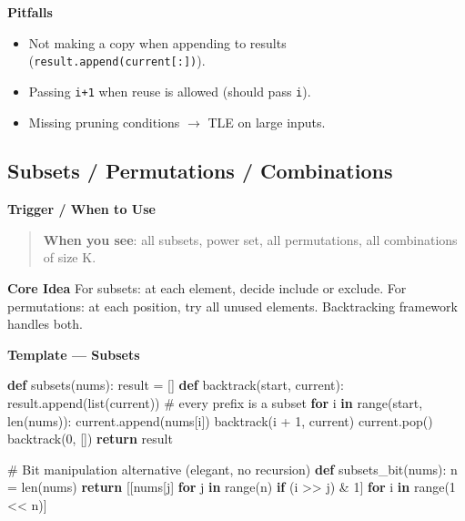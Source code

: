 \documentclass[11pt]{article}
\providecommand{\tightlist}{\setlength{\itemsep}{1pt}\setlength{\parskip}{0pt}}
\newenvironment{Shaded}{\begin{snugshade}}{\end{snugshade}}
\newcommand{\BuiltInTok}[1]{\textcolor[rgb]{0.50,0.55,0.55}{#1}}
\newcommand{\CommentTok}[1]{\textcolor[rgb]{0.48,0.49,0.49}{#1}}
\newcommand{\ControlFlowTok}[1]{\textcolor[rgb]{0.99,0.74,0.29}{\textbf{#1}}}
\newcommand{\DecValTok}[1]{\textcolor[rgb]{0.96,0.45,0.00}{#1}}
\newcommand{\KeywordTok}[1]{\textcolor[rgb]{0.81,0.81,0.76}{\textbf{#1}}}
\newcommand{\NormalTok}[1]{\textcolor[rgb]{0.81,0.81,0.76}{#1}}
\newcommand{\OperatorTok}[1]{\textcolor[rgb]{0.81,0.81,0.76}{#1}}
\begin{document}
\textbf{Pitfalls}

\begin{itemize}
\tightlist
\item
  Not making a copy when appending to results (\texttt{result.append(current{[}:{]})}).
\item
  Passing \texttt{i+1} when reuse is allowed (should pass \texttt{i}).
\item
  Missing pruning conditions \(\rightarrow\) TLE on large inputs.
\end{itemize}

\subsection{Subsets / Permutations / Combinations}\label{subsets--permutations--combinations}

\textbf{Trigger / When to Use}

\begin{quote}
\textbf{When you see}: all subsets, power set, all permutations, all combinations of size K.
\end{quote}

\textbf{Core Idea}
For subsets: at each element, decide include or exclude. For permutations: at each position, try all unused elements. Backtracking framework handles both.

\textbf{Template --- Subsets}


\begin{Shaded}
\begin{Highlighting}[]
\KeywordTok{def}\NormalTok{ subsets(nums):}
\NormalTok{    result }\OperatorTok{=}\NormalTok{ []}
    \KeywordTok{def}\NormalTok{ backtrack(start, current):}
\NormalTok{        result.append(}\BuiltInTok{list}\NormalTok{(current))        }\CommentTok{\# every prefix is a subset}
        \ControlFlowTok{for}\NormalTok{ i }\KeywordTok{in} \BuiltInTok{range}\NormalTok{(start, }\BuiltInTok{len}\NormalTok{(nums)):}
\NormalTok{            current.append(nums[i])}
\NormalTok{            backtrack(i }\OperatorTok{+} \DecValTok{1}\NormalTok{, current)}
\NormalTok{            current.pop()}
\NormalTok{    backtrack(}\DecValTok{0}\NormalTok{, [])}
    \ControlFlowTok{return}\NormalTok{ result}

\CommentTok{\# Bit manipulation alternative (elegant, no recursion)}
\KeywordTok{def}\NormalTok{ subsets\_bit(nums):}
\NormalTok{    n }\OperatorTok{=} \BuiltInTok{len}\NormalTok{(nums)}
    \ControlFlowTok{return}\NormalTok{ [[nums[j] }\ControlFlowTok{for}\NormalTok{ j }\KeywordTok{in} \BuiltInTok{range}\NormalTok{(n) }\ControlFlowTok{if}\NormalTok{ (i }\OperatorTok{\textgreater{}\textgreater{}}\NormalTok{ j) }\OperatorTok{\&} \DecValTok{1}\NormalTok{] }\ControlFlowTok{for}\NormalTok{ i }\KeywordTok{in} \BuiltInTok{range}\NormalTok{(}\DecValTok{1} \OperatorTok{\textless{}\textless{}}\NormalTok{ n)]}
\end{Highlighting}
\end{Shaded}
\end{document}
